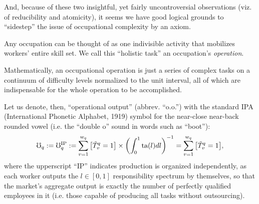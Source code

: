 \documentclass[hidelinks, nonatbib]{elsarticle}
\begin{document}
And, because of these two insightful, yet fairly uncontroversial observations (viz. of reducibility and atomicity), it seems we have good logical grounds to ``sidestep'' the issue of occupational complexity by an axiom.
\begin{axiom}
    \label{oca}
    Any occupation can be thought of as one indivisible activity that mobilizes workers' entire skill set. We call this ``holistic task'' an occupation's \textit{operation}.

    Mathematically, an occupational operation is just a series of complex tasks on a continuum of difficulty levels normalized to the unit interval, all of which are indispensable for the whole operation to be accomplished.
    
    \begin{subaxiom}
        Let us denote, then, ``operational output'' (abbrev. ``o.o.'') with the standard IPA (International Phonetic Alphabet, 1919) symbol for the near-close near-back rounded vowel (i.e. the ``double o'' sound in words such as ``boot''):
        \begin{gather}
            \mho_q
            :=
            \mho_{q}^{\text{IP}}
            :=
            \sum_{v=1}^{w_q}{
                \left[
                    \tilde{T}_{v}^{q}
                    =
                    1
                \right]
                \times
                \left(
                    \int_{0}^{1}{
                        \text{ta}(l)
                        dl
                    }
                \right) ^ {-1}
            }
            =
            \sum_{v=1}^{w_q}{
                \left[
                    \tilde{T}_{v}^{q}
                    =
                    1
                \right]
            }
            ,
        \end{gather}
        where the upperscript ``IP'' indicates production is organized independently, as each worker outputs the $l \in [0,1]$ responsibility spectrum by themselves, so that the market's aggregate output is exactly the number of perfectly qualified employees in it (i.e. those capable of producing all tasks without outsourcing).
        

\end{subaxiom}
\end{axiom}
\end{document}
